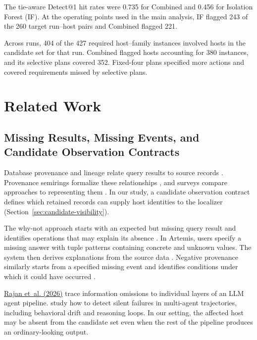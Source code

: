 \documentclass[sn-basic]{sn-jnl}%
\theoremstyle{thmstyleone}%
\theoremstyle{thmstyletwo}%
\theoremstyle{thmstylethree}%
\begin{document}
The tie-aware Detect@1 hit rates were 0.735 for Combined and 0.456 for Isolation Forest (IF). At the operating points used in the main analysis, IF flagged 243 of the 260 target run--host pairs and Combined flagged 221.

Across runs, 404 of the 427 required host--family instances involved hosts in the candidate set for that run. Combined flagged hosts accounting for 380 instances, and its selective plans covered 352. Fixed-four plans specified more actions and covered requirements missed by selective plans.

\section{Related Work}\label{sec:related-work}

\subsection{Missing Results, Missing Events, and Candidate Observation Contracts}\label{sec:missing-results}

Database provenance and lineage relate query results to source records \citep{buneman2001,cui2000}. Provenance semirings formalize these relationships \citep{green2007}, and surveys compare approaches to representing them \citep{cheney2009,herschel2017}. In our study, a candidate observation contract defines which retained records can supply host identities to the localizer (Section~\ref{sec:candidate-visibility}).

The why-not approach starts with an expected but missing query result and identifies operations that may explain its absence \citep{chapman2009whynot}. In Artemis, users specify a missing answer with tuple patterns containing concrete and unknown values. The system then derives explanations from the source data \citep{herschel2010spjua}. Negative provenance similarly starts from a specified missing event and identifies conditions under which it could have occurred \citep{wu2014negativeprovenance}.

\href{https://arxiv.org/abs/2607.22448v3}{Rajan et~al. (2026)} trace information omissions to individual layers of an LLM agent pipeline. \citet{pathak2026silent} study how to detect silent failures in multi-agent trajectories, including behavioral drift and reasoning loops. In our setting, the affected host may be absent from the candidate set even when the rest of the pipeline produces an ordinary-looking output.
\end{document}

